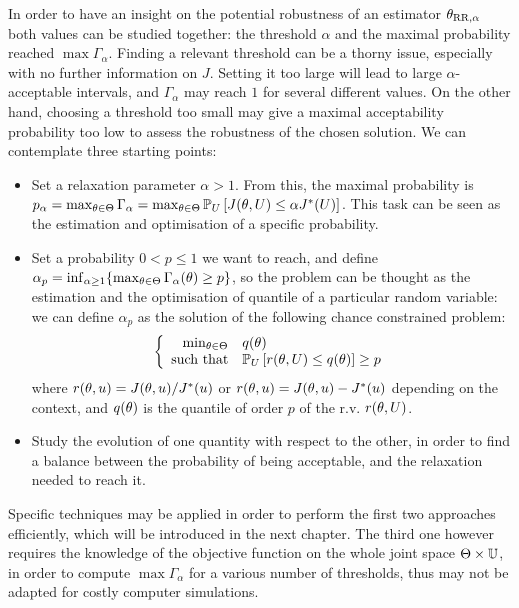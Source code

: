\documentclass[../../Main_ManuscritThese.tex]{subfiles}
\begin{document}
In order to have an insight on the potential robustness of an
estimator ${\theta}_{\mathrm{RR,\alpha}}$ both values can be studied
together: the threshold $\alpha$ and the maximal probability reached
$\max \Gamma_\alpha$. Finding a relevant threshold can be a thorny
issue, especially with no further information on $J$. Setting it too
large will lead to large $\alpha$-acceptable intervals, and
$\Gamma_\alpha$ may reach $1$ for several different values. On the
other hand, choosing a threshold too small may give a maximal
acceptability probability too low to assess the robustness of the
chosen solution. We can contemplate three starting points:
 \begin{itemize}
 \item Set a relaxation parameter $\alpha > 1$. From this, the maximal
   probability is
   $p_{\alpha} = \max_{\theta\in\Theta} \Gamma_{\alpha} =
   \max_{\theta\in\Theta} \mathbb{P}_{U}\left[J(\theta, U) \leq \alpha
     J^*(U)\right]$. This task can be seen as the estimation and
   optimisation of a specific probability.

   
\item Set a probability $0< p\leq 1 $ we want to reach, and define
  $\alpha_p = \inf_{\alpha \geq 1}\{\max_{\theta \in
    \Theta}\Gamma_{\alpha}(\theta)\geq p \}$, so the problem can be
  thought as the estimation and the optimisation of quantile of a
  particular random variable: we can define $\alpha_p$ as the solution
  of the following chance constrained problem:
  \begin{equation}
    \label{eq:opt_alpha_p_formulation}
  \left\{
  \begin{array}{rl}
    \min_{\theta\in\Theta} &  q(\theta) \\
  \text{such that} & \mathbb{P}_{U}\left[r(\theta, U) \leq q(\theta) \right] \geq p
  \end{array}
  \right.
\end{equation}
where $r(\theta, u) = J(\theta, u)/J^*(u)$ or
$r(\theta, u)=J(\theta, u) - J^*(u)$ depending on the context, and
$q(\theta)$ is the quantile of order $p$ of the r.v. $r(\theta, U)$.



\item Study the evolution of one quantity with respect to the other,
  in order to find a balance between the probability of being
  acceptable, and the relaxation needed to reach it.
\end{itemize}

Specific techniques may be applied in order to perform the first two
approaches efficiently, which will be introduced in the next
chapter. The third one however requires the knowledge of the objective
function on the whole joint space $\Theta \times \mathbb{U}$, in order
to compute $\max \Gamma_{\alpha}$ for a various number of thresholds, thus may
not be adapted for costly computer simulations.
\end{document}
